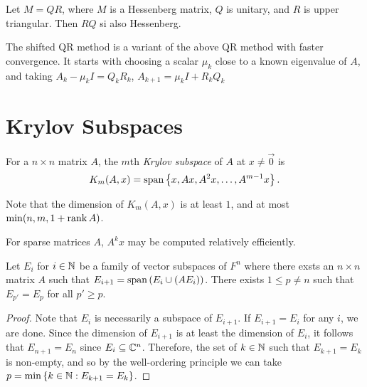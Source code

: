 \begin{prop}\label{hessenberg-qr-swap}
    Let $M = QR$, where $M$ is a Hessenberg matrix, $Q$ is unitary, and $R$ is upper triangular. Then $RQ$ si also Hessenberg.
\end{prop}

\begin{defn}
    The shifted QR method is a variant of the above QR method with faster convergence. It starts with choosing a scalar $\mu_k$ close to a known eigenvalue of $A$, and taking $A_{k} - \mu_kI = Q_{k}R_{k}$, $A_{k+1} = \mu_kI + R_{k}Q_{k}$
\end{defn}

\section{Krylov Subspaces}

\begin{defn}
    For a $n \times n$ matrix $A$, the $m$th \emph{Krylov subspace} of $A$ at $x \neq \vec{0}$ is
    \begin{align*}
        K_m(A, x) = \operatorname{span}\left\{x, Ax, A^2x, \ldots, A^{m-1}x\right\}.
    \end{align*}
\end{defn}

\begin{rmk}
    Note that the dimension of $K_m(A, x)$ is at least $1$, and at most $\min(n, m, 1 + \operatorname{rank} A)$.
\end{rmk}

\begin{rmk}
    For sparse matrices $A$, $A^{k}x$ may be computed relatively efficiently.
\end{rmk}

\begin{lemma}
    Let $E_i$ for $i \in \mathbb{N}$ be a family of vector subspaces of $F^n$ where there exsts an $n \times n$ matrix $A$ such that $E_{i+1} = \operatorname{span}\left(E_i \cup \left(AE_i\right)\right)$. There exists $1 \leq p \neq n$ such that $E_{p'} = E_p$ for all $p' \geq p$.
\end{lemma}

\begin{proof}
    Note that $E_i$ is necessarily a subspace of $E_{i+1}$. If $E_{i+1} = E_i$ for any $i$, we are done. Since the dimension of $E_{i+1}$ is at least the dimension of $E_i$, it follows that $E_{n+1} = E_n$ since $E_i \subseteq \mathbb{C}^n$. Therefore, the set of $k \in \mathbb{N}$ such that $E_{k+1} = E_k$ is non-empty, and so by the well-ordering principle we can take $p = \min\left\{k \in \mathbb{N} : E_{k+1} = E_k\right\}$.
\end{proof}

